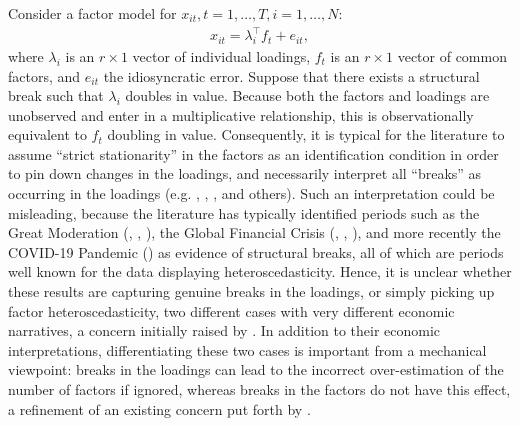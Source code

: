 \documentclass[12pt]{article}
\newcommand*{\tran}{\intercal}
\theoremstyle{plain}
\numberwithin{equation}{section}
\begin{document}
Consider a factor model for $x_{it}, t = 1, \dots, T, i = 1, \dots, N$:
\begin{align}
x_{it} = \lambda_{i}^\tran f_t + e_{it},
\end{align}
where $\lambda_{i}$ is an $r \times 1$ vector of individual loadings, $f_t$ is an $r \times 1$ vector of common factors, and $e_{it}$ the idiosyncratic error. Suppose that there exists a structural break such that $\lambda_i$ doubles in value. Because both the factors and loadings are unobserved and enter in a multiplicative relationship, this is observationally equivalent to $f_t$ doubling in value. Consequently, it is typical for the literature to assume ``strict stationarity'' in the factors as an identification condition in order to pin down changes in the loadings, and necessarily interpret all ``breaks'' as occurring in the loadings (e.g. \textcite{chen_detecting_2014}, \textcite{han_tests_2015}, \textcite{baltagi_identification_2017}, and others).
% 
Such an interpretation could be misleading, because the literature has typically identified periods such as the Great Moderation (\textcite{stock_forecasting_2009}, \textcite{breitung_testing_2011}, \textcite{baltagi_estimating_2021}), the Global Financial Crisis (\textcite{ma_estimation_2018}, \textcite{barigozzi_sequential_2020}, \textcite{ma_group_2022}), and more recently the COVID-19 Pandemic (\textcite{bai_likelihood_2022}) as evidence of structural breaks, all of which are periods well known for the data displaying heteroscedasticity. Hence, it is unclear whether these results are capturing genuine breaks in the loadings, or simply picking up factor heteroscedasticity, two different cases with very different economic narratives, a concern initially raised by \textcite
{stock_chapter_2016}. In addition to their economic interpretations, differentiating these two cases is important from a mechanical viewpoint: breaks in the loadings can lead to the incorrect over-estimation of the number of factors if ignored, whereas breaks in the factors do not have this effect, a refinement of an existing concern put forth by \textcite{breitung_testing_2011}.
\end{document}
